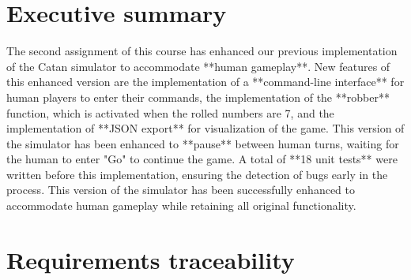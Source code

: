 \section{Executive summary}

The second assignment of this course has enhanced our previous implementation of the Catan simulator to accommodate **human gameplay**. New features of this enhanced version are the implementation of a **command-line interface** for human players to enter their commands, the implementation of the **robber** function, which is activated when the rolled numbers are 7, and the implementation of **JSON export** for visualization of the game. This version of the simulator has been enhanced to **pause** between human turns, waiting for the human to enter "Go" to continue the game. A total of **18 unit tests** were written before this implementation, ensuring the detection of bugs early in the process. This version of the simulator has been successfully enhanced to accommodate human gameplay while retaining all original functionality.


\section{Requirements traceability}

